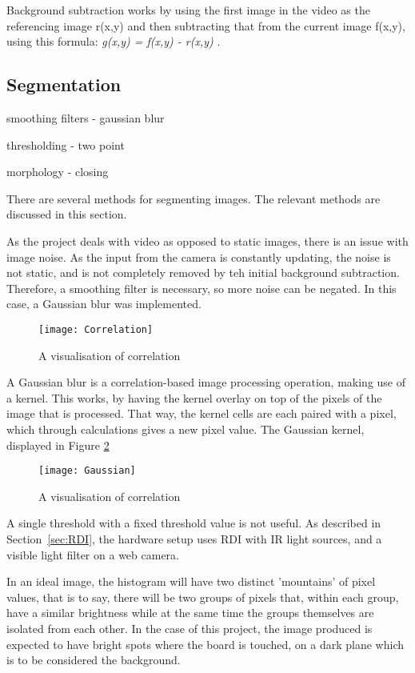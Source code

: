 Background subtraction works by using the first image in the video as the referencing image r(x,y) and then subtracting that from the current image f(x,y), using this formula: \textit{g(x,y) = f(x,y) - r(x,y)} \citep{moeslund_introduction_2012}. 

\subsection{Segmentation}
smoothing filters
- gaussian blur

thresholding - two point

morphology - closing

There are several methods for segmenting images. The relevant methods are discussed in this section. 

As the project deals with video as opposed to static images, there is an issue with image noise. As the input from the camera is constantly updating, the noise is not static, and is not completely removed by teh initial background subtraction. Therefore, a smoothing filter is necessary, so more noise can be negated. In this case, a Gaussian blur was implemented.

\begin{figure}[h!]
\centering \texttt{[image: Correlation]}
\caption{A visualisation of correlation \label{Fig:Correlation}\citep{moeslund_introduction_2012}}
\end{figure}

A Gaussian blur is a correlation-based image processing operation, making use of a kernel. This works, by having the kernel overlay on top of the pixels of the image that is processed. That way, the kernel cells are each paired with a pixel, which through calculations gives a new pixel value. The Gaussian kernel, displayed in Figure \ref{Fig:Gaussian} 

\begin{figure}[h!]
\centering \texttt{[image: Gaussian]}
\caption{A visualisation of correlation \label{Fig:Gaussian}\citep{moeslund_introduction_2012}}
\end{figure}

A single threshold with a fixed threshold value is not useful. As described in Section~\ref{sec:RDI}, the hardware setup uses RDI with IR light sources, and a visible light filter on a web camera. 
 
 
 
 
In an ideal image, the histogram will have two distinct 'mountains' of pixel values, that is to say, there will be two groups of pixels that, within each group, have a similar brightness while at the same time the groups themselves are isolated from each other. In the case of this project, the image produced is expected to have bright spots where the board is touched, on a dark plane which is to be considered the background.
 
